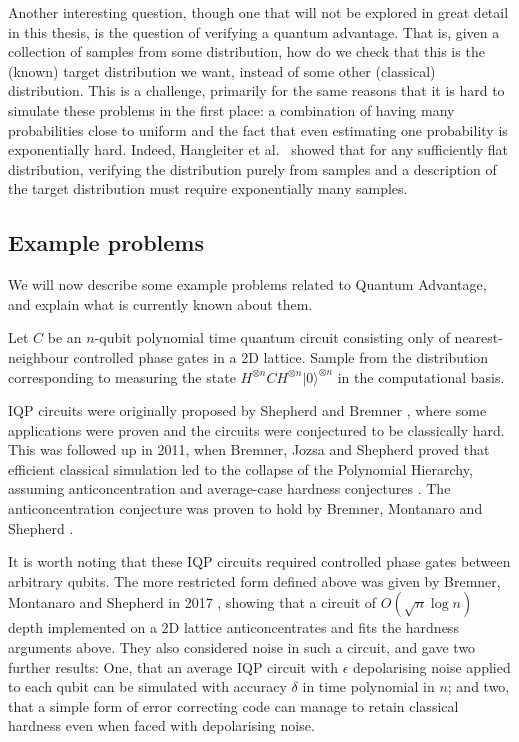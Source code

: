 Another interesting question, though one that will not be explored in great detail in this thesis, is the question of verifying a quantum advantage. That is, given a collection of samples from some distribution, how do we check that this is the (known) target distribution we want, instead of some other (classical) distribution. This is a challenge, primarily for the same reasons that it is hard to simulate these problems in the first place: a combination of having many probabilities close to uniform and the fact that even estimating one probability is exponentially hard. Indeed, Hangleiter et al.~\cite{hangleiter2019} showed that for any sufficiently flat distribution, verifying the distribution purely from samples and a description of the target distribution must require exponentially many samples.

\subsection{Example problems}
\label{ssec:qa-examples}

We will now describe some example problems related to Quantum Advantage, and explain what is currently known about them.

\begin{problem} Let $C$ be an $n$-qubit polynomial time quantum circuit consisting only of nearest-neighbour controlled phase gates in a 2D lattice. Sample from the distribution corresponding to measuring the state $H^{\otimes n}CH^{\otimes n}|0\rangle^{\otimes n}$ in the computational basis.
\end{problem}

IQP circuits were originally proposed by Shepherd and Bremner \cite{shepherd2009thesis, shepherd2009}, where some applications were proven and the circuits were conjectured to be classically hard. This was followed up in 2011, when Bremner, Jozsa and Shepherd proved that efficient classical simulation led to the collapse of the Polynomial Hierarchy, assuming anticoncentration and average-case hardness conjectures \cite{bremner2011}. The anticoncentration conjecture was proven to hold by Bremner, Montanaro and Shepherd \cite{bremner2016}.

It is worth noting that these IQP circuits required controlled phase gates between arbitrary qubits. The more restricted form defined above was given by Bremner, Montanaro and Shepherd in 2017 \cite{bremner2017}, showing that a circuit of $O(\sqrt{n}\log n)$ depth implemented on a 2D lattice anticoncentrates and fits the hardness arguments above. They also considered noise in such a circuit, and gave two further results: One, that an average IQP circuit with $\epsilon$ depolarising noise applied to each qubit can be simulated with accuracy $\delta$ in time polynomial in $n$; and two, that a simple form of error correcting code can manage to retain classical hardness even when faced with depolarising noise.

